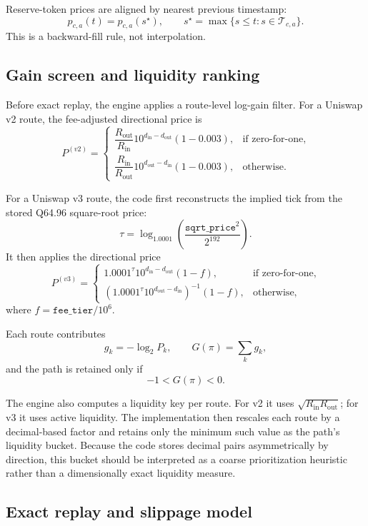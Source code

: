 \documentclass[11pt]{article}
\begin{document}
Reserve-token prices are aligned by nearest previous timestamp:
\[
p_{c,a}(t) = p_{c,a}(s^\star),
\qquad
s^\star = \max\{ s \le t : s \in \mathcal{T}_{c,a} \}.
\]
This is a backward-fill rule, not interpolation.

\subsection{Gain screen and liquidity ranking}

Before exact replay, the engine applies a route-level log-gain filter. For a Uniswap v2 route, the fee-adjusted directional price is
\[
P^{(v2)} =
\begin{cases}
\dfrac{R_{\text{out}}}{R_{\text{in}}} 10^{d_{\text{in}}-d_{\text{out}}}(1-0.003), & \text{if zero-for-one},\\[1.0em]
\dfrac{R_{\text{in}}}{R_{\text{out}}} 10^{d_{\text{out}}-d_{\text{in}}}(1-0.003), & \text{otherwise.}
\end{cases}
\]

For a Uniswap v3 route, the code first reconstructs the implied tick from the stored Q64.96 square-root price:
\[
\tau = \log_{1.0001}\!\left(\frac{\texttt{sqrt\_price}^2}{2^{192}}\right).
\]
It then applies the directional price
\[
P^{(v3)} =
\begin{cases}
1.0001^{\tau} 10^{d_{\text{in}}-d_{\text{out}}}(1-f), & \text{if zero-for-one},\\[0.6em]
\left(1.0001^{\tau} 10^{d_{\text{out}}-d_{\text{in}}}\right)^{-1}(1-f), & \text{otherwise,}
\end{cases}
\]
where \(f=\texttt{fee\_tier}/10^6\).

Each route contributes
\[
g_k = -\log_2 P_k,
\qquad
G(\pi)=\sum_k g_k,
\]
and the path is retained only if
\[
-1 < G(\pi) < 0.
\]

The engine also computes a liquidity key per route. For v2 it uses \(\sqrt{R_{\text{in}}R_{\text{out}}}\); for v3 it uses active liquidity. The implementation then rescales each route by a decimal-based factor and retains only the minimum such value as the path's liquidity bucket. Because the code stores decimal pairs asymmetrically by direction, this bucket should be interpreted as a coarse prioritization heuristic rather than a dimensionally exact liquidity measure.

\subsection{Exact replay and slippage model}
\end{document}
